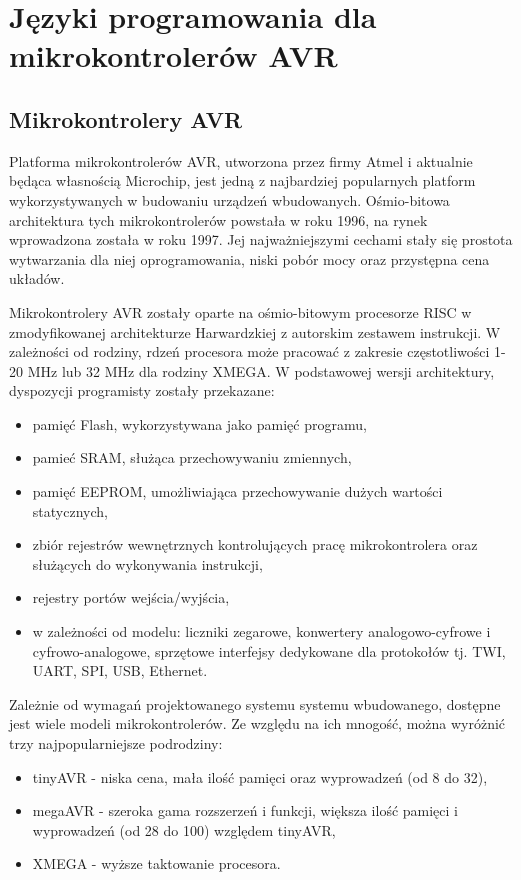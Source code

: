 \chapter{Języki programowania dla mikrokontrolerów AVR}
\label{ch:02}

\section{Mikrokontrolery AVR}
Platforma mikrokontrolerów AVR, utworzona przez firmy Atmel i aktualnie będąca własnością Microchip, jest jedną z najbardziej popularnych platform wykorzystywanych w budowaniu urządzeń wbudowanych. Ośmio-bitowa architektura tych mikrokontrolerów powstała w roku 1996, na rynek wprowadzona została w roku 1997. Jej najważniejszymi cechami stały się prostota wytwarzania dla niej oprogramowania, niski pobór mocy oraz przystępna cena układów.

Mikrokontrolery AVR zostały oparte na ośmio-bitowym procesorze RISC w zmodyfikowanej architekturze Harwardzkiej z autorskim zestawem instrukcji. W zależności od rodziny, rdzeń procesora może pracować z zakresie częstotliwości 1-20 MHz lub 32 MHz dla rodziny XMEGA.
W podstawowej wersji architektury, dyspozycji programisty zostały przekazane:
\begin{itemize}
\item pamięć Flash, wykorzystywana jako pamięć programu,
\item pamieć SRAM, służąca przechowywaniu zmiennych,
\item pamięć EEPROM, umożliwiająca przechowywanie dużych wartości statycznych,
\item zbiór rejestrów wewnętrznych kontrolujących pracę mikrokontrolera oraz służących do wykonywania instrukcji,
\item rejestry portów wejścia/wyjścia,
\item w zależności od modelu: liczniki zegarowe, konwertery analogowo-cyfrowe i cyfrowo-analogowe, sprzętowe interfejsy dedykowane dla protokołów tj. TWI, UART, SPI, USB, Ethernet.
\end{itemize}

Zależnie od wymagań projektowanego systemu systemu wbudowanego, dostępne jest wiele modeli mikrokontrolerów. Ze względu na ich mnogość, można wyróżnić trzy najpopularniejsze podrodziny:
\begin{itemize}
\item tinyAVR - niska cena, mała ilość pamięci oraz wyprowadzeń (od 8 do 32),
\item megaAVR - szeroka gama rozszerzeń i funkcji, większa ilość pamięci i wyprowadzeń (od 28 do 100) względem tinyAVR,
\item XMEGA - wyższe taktowanie procesora.
\end{itemize}

